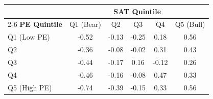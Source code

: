 \begin{tabular}{lccccc}
\toprule
& \multicolumn{5}{c}{\textbf{SAT Quintile}} \\
\cmidrule(lr){2-6}
\textbf{PE Quintile} & Q1 (Bear) & Q2 & Q3 & Q4 & Q5 (Bull) \\
\midrule
Q1 (Low PE) & -0.52 & -0.13 & -0.25 & 0.18 & 0.56 \\
Q2 & -0.36 & -0.08 & -0.02 & 0.31 & 0.43 \\
Q3 & -0.44 & -0.17 & 0.16 & -0.12 & 0.26 \\
Q4 & -0.46 & -0.16 & -0.08 & 0.47 & 0.33 \\
Q5 (High PE) & -0.74 & -0.39 & -0.15 & 0.33 & 0.56 \\
\bottomrule
\end{tabular}